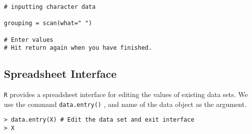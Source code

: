\documentclass[a4paper,12pt]{article}
\begin{document}
\begin{verbatim}
# inputting character data

grouping = scan(what=" ")

# Enter values
# Hit return again when you have finished.

\end{verbatim}


\subsection{Spreadsheet Interface}
\texttt{R} provides a spreadsheet interface for editing the values of existing data sets.
We use the command \texttt{data.entry()} , and name of the data object as the argument.

\begin{verbatim}
> data.entry(X) # Edit the data set and exit interface
> X
\end{verbatim}













\end{document}
